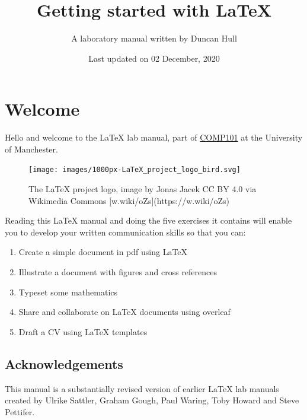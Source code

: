 \documentclass[
]{book}
\title{Getting started with LaTeX}
\author{A laboratory manual written by Duncan Hull}
\date{Last updated on 02 December, 2020}
\providecommand{\tightlist}{%
  \setlength{\itemsep}{0pt}\setlength{\parskip}{0pt}}
\begin{document}
\maketitle

{
\setcounter{tocdepth}{1}
\tableofcontents
}
\hypertarget{welcome}{%
\chapter*{Welcome}\label{welcome}}

Hello and welcome to the LaTeX lab manual, part of \href{https://studentnet.cs.manchester.ac.uk/ugt/COMP10120/syllabus/}{COMP101} at the University of Manchester.

\begin{figure}

{\centering \texttt{[image: images/1000px-LaTeX\_project\_logo\_bird.svg]} 

}

\caption{The LaTeX project logo, image by Jonas Jacek CC BY 4.0 via Wikimedia Commons [w.wiki/oZs](https://w.wiki/oZs)}\label{fig:latexproject-fig}
\end{figure}

Reading this LaTeX manual and doing the five exercises it contains will enable you to develop your written communication skills so that you can:

\begin{enumerate}
\def\labelenumi{\arabic{enumi}.}
\tightlist
\item
  Create a simple document in pdf using LaTeX
\item
  Illustrate a document with figures and cross references
\item
  Typeset some mathematics
\item
  Share and collaborate on LaTeX documents using overleaf
\item
  Draft a CV using LaTeX templates
\end{enumerate}

\hypertarget{acknowledgements}{%
\section*{Acknowledgements}\label{acknowledgements}}

This manual is a substantially revised version of earlier LaTeX lab manuals created by Ulrike Sattler, Graham Gough, Paul Waring, Toby Howard and Steve Pettifer.
\end{document}
